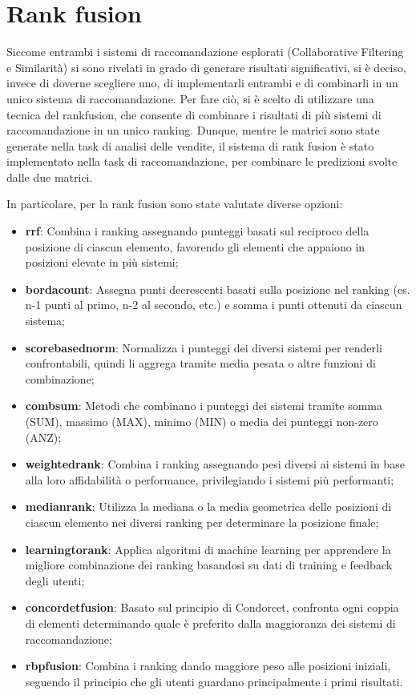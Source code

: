 \section{Rank fusion}

Siccome entrambi i sistemi di raccomandazione esplorati (Collaborative Filtering e Similarità) si sono rivelati in grado di generare risultati significativi, si è deciso, invece di doverne scegliere uno, di implementarli entrambi e di combinarli in un unico sistema di raccomandazione. Per fare ciò, si è scelto di utilizzare una tecnica del \gls{rankfusion}, che consente di combinare i risultati di più sistemi di raccomandazione in un unico ranking.
Dunque, mentre le matrici sono state generate nella task di analisi delle vendite, il sistema di rank fusion è stato implementato nella task di raccomandazione, per combinare le predizioni svolte dalle due matrici.

In particolare, per la rank fusion sono state valutate diverse opzioni:
\begin{itemize}
    \item \textbf{\gls{rrf}}: Combina i ranking assegnando punteggi basati sul reciproco della posizione di ciascun elemento, favorendo gli elementi che appaiono in posizioni elevate in più sistemi;
    \item \textbf{\gls{bordacount}}: Assegna punti decrescenti basati sulla posizione nel ranking (es. n-1 punti al primo, n-2 al secondo, etc.) e somma i punti ottenuti da ciascun sistema;
    \item \textbf{\gls{scorebasednorm}}: Normalizza i punteggi dei diversi sistemi per renderli confrontabili, quindi li aggrega tramite media pesata o altre funzioni di combinazione;
    \item \textbf{\gls{combsum}}: Metodi che combinano i punteggi dei sistemi tramite somma (SUM), massimo (MAX), minimo (MIN) o media dei punteggi non-zero (ANZ);
    \item \textbf{\gls{weightedrank}}: Combina i ranking assegnando pesi diversi ai sistemi in base alla loro affidabilità o performance, privilegiando i sistemi più performanti;
    \item \textbf{\gls{medianrank}}: Utilizza la mediana o la media geometrica delle posizioni di ciascun elemento nei diversi ranking per determinare la posizione finale;
    \item \textbf{\gls{learningtorank}}: Applica algoritmi di machine learning per apprendere la migliore combinazione dei ranking basandosi su dati di training e feedback degli utenti;
    \item \textbf{\gls{concordetfusion}}: Basato sul principio di Condorcet, confronta ogni coppia di elementi determinando quale è preferito dalla maggioranza dei sistemi di raccomandazione;
    \item \textbf{\gls{rbpfusion}}: Combina i ranking dando maggiore peso alle posizioni iniziali, seguendo il principio che gli utenti guardano principalmente i primi risultati.
\end{itemize}

